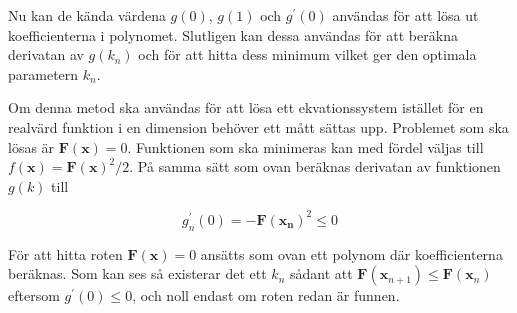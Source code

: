 Nu kan de kända värdena $g(0)$, $g(1)$ och $g^\prime(0)$ användas för att lösa ut koefficienterna i polynomet.
Slutligen kan dessa användas för att beräkna derivatan av $g(k_n)$ och för att hitta dess minimum vilket ger den optimala parametern $k_n$.

Om denna metod ska användas för att lösa ett ekvationssystem istället för en realvärd funktion i en dimension behöver ett mått sättas upp. Problemet som ska lösas är $\mathbf{F}(\mathbf{x}) = 0$.
Funktionen som ska minimeras kan med fördel väljas till $f(\mathbf{x}) = \mathbf{F}(\mathbf{x})^2/2$.
På samma sätt som ovan beräknas derivatan av funktionen $g(k)$ till\cite{fortran77}

\begin{equation}
\label{eq:newtonvecg}
g_n^\prime(0) = - \mathbf{F}(\mathbf{x_n})^2 \le 0
\end{equation}

För att hitta roten $\mathbf{F}(\mathbf{x}) = 0$ ansätts som ovan ett polynom där koefficienterna beräknas.
Som kan ses så existerar det ett $k_n$ sådant att $\mathbf{F}(\mathbf{x}_{n+1}) \le \mathbf{F}(\mathbf{x}_n)$ eftersom
$g^\prime(0) \le 0$, och noll endast om roten redan är funnen.


